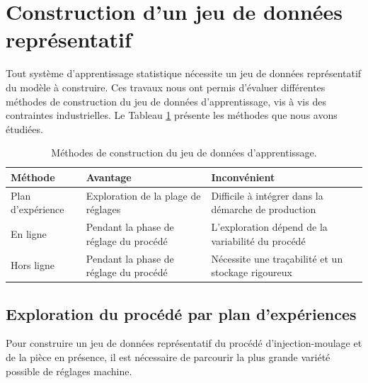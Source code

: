 \minitoc
\newpage

\section{Construction d'un jeu de données représentatif} \label{sec:dataset_construction}
Tout système d'apprentissage statistique nécessite un jeu de données représentatif du modèle à construire.
Ces travaux nous ont permis d'évaluer différentes méthodes de construction du jeu de données d'apprentissage, vis à vis des contraintes industrielles.
Le Tableau \ref{tab:dataset} présente les méthodes que nous avons étudiées.

\begin{table}[h]
    \hspace*{-8mm}
    \begin{tabular}{|l|l|l|}
        \arrayrulecolor{black}
        \hline
        Méthode           & Avantage                                           & Inconvénient                                        \\ \hline
        \hline
        Plan d’expérience & Exploration de la plage de réglages  & Difficile à intégrer dans la démarche de production \\ \hline
        En ligne          & Pendant la phase de réglage du procédé & L’exploration dépend de la variabilité du procédé    \\ \hline
        Hors ligne        & Pendant la phase de réglage du procédé & Nécessite une traçabilité et un stockage rigoureux \\ \hline
    \end{tabular}
    \caption{Méthodes de construction du jeu de données d'apprentissage.}
    \label{tab:dataset}
\end{table}

\subsection{Exploration du procédé par plan d'expériences} \label{subsec:doe}
Pour construire un jeu de données représentatif du procédé d'injection-moulage et de la pièce en présence, il est nécessaire de parcourir la plus grande variété possible de réglages machine.

